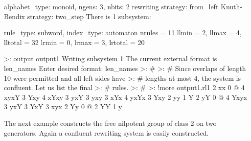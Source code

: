 {alphabet\_type:  monoid,  ngens:  3,   nbits:  2
rewriting strategy:  from\_left
Knuth-Bendix strategy:  two\_step
There is 1 subsystem:

rule\_type:  subword,  index\_type:  automaton
nrules = 11
llmin  = 2,  llmax = 4,  lltotal = 32
lrmin  = 0,  lrmax = 3,  lrtotal = 20

>: output output1
Writing subsystem 1
The current external format is len\_names
Enter desired format:  len\_names
>: \#
>: \# Since overlaps of length 10 were permitted and all left sides have
>: \# lengths at most 4, the system is confluent.  Let us list the final
>: \# rules.
>: \#
>: !more output1.rl1
2 xx 0 @
4 xyxY 3 Yxy
4 xYxy 3 yxY
3 yxy 3 xYx
4 yxYx 3 Yxy
2 yy 1 Y
2 yY 0 @
4 Yxyx 3 yxY
3 YxY 3 xyx
2 Yy 0 @
2 YY 1 y
}

\bigskip

The next example constructs the free nilpotent group of class 2 on two
generators.  Again a confluent rewriting system is easily constructed.

